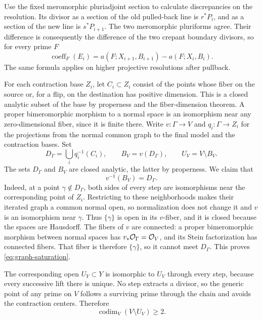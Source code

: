 Use the fixed meromorphic pluriadjoint section to calculate discrepancies
on the resolution.  Its divisor as a section of the old pulled-back line
is \(r^*P_i\), and as a section of the new line is \(s^*P_{i+1}\).
The two meromorphic pluriforms agree.  Their difference is consequently
the difference of the two crepant boundary divisors, so for every prime
\(F\)
\begin{equation}\label{eq:discrepancy-increase}
 \operatorname{coeff}_F(E_i)
 =a(F;X_{i+1},B_{i+1})-a(F;X_i,B_i).
\end{equation}
The same formula applies on higher projective resolutions after pullback.

For each contraction base \(Z_i\), let \(C_i\subset Z_i\) consist of
the points whose fiber on the source or, for a flip, on the destination
has positive dimension.  This is a closed analytic subset of the base
by properness and the fiber-dimension theorem.  A proper bimeromorphic
morphism to a normal space is an
isomorphism near any zero-dimensional fiber, since it is finite there.
Write \(v:\Gamma\to V\) and \(q_i:\Gamma\to Z_i\) for the projections
from the normal common graph to the final model and the contraction bases.
Set
\begin{equation}\label{eq:graph-bad-set}
 D_\Gamma=\bigcup_i q_i^{-1}(C_i),\qquad
 B_V=v(D_\Gamma),\qquad U_V=V\setminus B_V.
\end{equation}
The sets \(D_\Gamma\) and \(B_V\) are closed analytic, the latter by
properness.  We claim that
\begin{equation}\label{eq:graph-saturation}
 v^{-1}(B_V)=D_\Gamma.
\end{equation}
Indeed, at a point \(\gamma\notin D_\Gamma\), both sides of every step
are isomorphisms near the corresponding point of \(Z_i\).  Restricting
to these neighborhoods makes their iterated graph a common normal open,
so normalization does not change it and \(v\) is an isomorphism near
\(\gamma\).  Thus \(\{\gamma\}\) is open in its \(v\)-fiber, and it is
closed because the spaces are Hausdorff.  The fibers of \(v\) are
connected: a proper bimeromorphic morphism between normal spaces has
\(v_*\mathcal O_\Gamma=\mathcal O_V\), and its Stein factorization has connected
fibers.  That fiber is therefore \(\{\gamma\}\), so it cannot meet
\(D_\Gamma\).  This proves \eqref{eq:graph-saturation}.

The corresponding open \(U_Y\subset Y\) is isomorphic to \(U_V\)
through every step, because every successive lift there is unique.
No step extracts a divisor, so the
generic point of any prime on \(V\) follows a surviving prime through
the chain and avoids the contraction centers.  Therefore
\begin{equation}\label{eq:bad-codim}
 \operatorname{codim}_V(V\setminus U_V)\geq2.
\end{equation}

